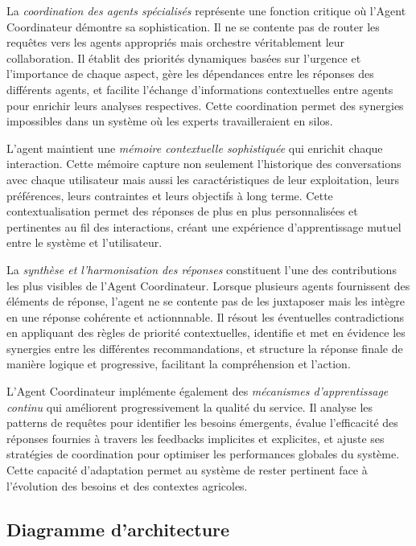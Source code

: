 La \emph{coordination des agents spécialisés} représente une fonction critique où l'Agent Coordinateur démontre sa sophistication. Il ne se contente pas de router les requêtes vers les agents appropriés mais orchestre véritablement leur collaboration. Il établit des priorités dynamiques basées sur l'urgence et l'importance de chaque aspect, gère les dépendances entre les réponses des différents agents, et facilite l'échange d'informations contextuelles entre agents pour enrichir leurs analyses respectives. Cette coordination permet des synergies impossibles dans un système où les experts travailleraient en silos.

L'agent maintient une \emph{mémoire contextuelle sophistiquée} qui enrichit chaque interaction. Cette mémoire capture non seulement l'historique des conversations avec chaque utilisateur mais aussi les caractéristiques de leur exploitation, leurs préférences, leurs contraintes et leurs objectifs à long terme. Cette contextualisation permet des réponses de plus en plus personnalisées et pertinentes au fil des interactions, créant une expérience d'apprentissage mutuel entre le système et l'utilisateur.

La \emph{synthèse et l'harmonisation des réponses} constituent l'une des contributions les plus visibles de l'Agent Coordinateur. Lorsque plusieurs agents fournissent des éléments de réponse, l'agent ne se contente pas de les juxtaposer mais les intègre en une réponse cohérente et actionnnable. Il résout les éventuelles contradictions en appliquant des règles de priorité contextuelles, identifie et met en évidence les synergies entre les différentes recommandations, et structure la réponse finale de manière logique et progressive, facilitant la compréhension et l'action.

L'Agent Coordinateur implémente également des \emph{mécanismes d'apprentissage continu} qui améliorent progressivement la qualité du service. Il analyse les patterns de requêtes pour identifier les besoins émergents, évalue l'efficacité des réponses fournies à travers les feedbacks implicites et explicites, et ajuste ses stratégies de coordination pour optimiser les performances globales du système. Cette capacité d'adaptation permet au système de rester pertinent face à l'évolution des besoins et des contextes agricoles.

\subsection{Diagramme d'architecture}

